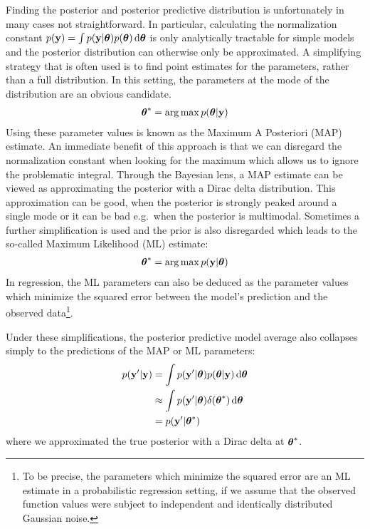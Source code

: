\documentclass[../thesis.tex]{subfiles}
\begin{document}
Finding the posterior and posterior predictive distribution is unfortunately in many cases not straightforward. In particular, calculating the normalization constant $p(\boldsymbol{\mathbf{y}})=\int p(\boldsymbol{\mathbf{y}} | \boldsymbol{\mathbf{\theta}}) p(\boldsymbol{\mathbf{\theta}}) \mathop{}\!\mathrm{d}\boldsymbol{\mathbf{\theta}}$ is only analytically tractable for simple models and the posterior distribution can otherwise only be approximated. A simplifying strategy that is often used is to find point estimates for the parameters, rather than a full distribution. In this setting, the parameters at the mode of the distribution are an obvious candidate.
\begin{equation}
    \begin{split}
        \boldsymbol{\mathbf{\theta}}^{*} = \operatorname*{arg\,max} p(\boldsymbol{\mathbf{\theta}} | \boldsymbol{\mathbf{y}})
    \end{split}
\end{equation}
Using these parameter values is known as the Maximum A Posteriori (MAP) estimate. An immediate benefit of this approach is that we can disregard the normalization constant when looking for the maximum which allows us to ignore the problematic integral. Through the Bayesian lens, a MAP estimate can be viewed as approximating the posterior with a Dirac delta distribution. This approximation can be good, when the posterior is strongly peaked around a single mode or it can be bad e.g.\ when the posterior is multimodal. Sometimes a further simplification is used and the prior is also disregarded which leads to the so-called Maximum Likelihood (ML) estimate:
\begin{equation}
    \begin{split}
        \boldsymbol{\mathbf{\theta}}^{*} = \operatorname*{arg\,max} p(\boldsymbol{\mathbf{y}} | \boldsymbol{\mathbf{\theta}})
    \end{split}
\end{equation}
In regression, the ML parameters can also be deduced as the parameter values which minimize the squared error between the model's prediction and the observed data\footnote{To be precise, the parameters which minimize the squared error are an ML estimate in a probabilistic regression setting, if we assume that the observed function values were subject to independent and identically distributed Gaussian noise.}. 

Under these simplifications, the posterior predictive model average also collapses simply to the predictions of the MAP or ML parameters:
\begin{equation}
    \begin{split}
        p(\boldsymbol{\mathbf{y}}' | \boldsymbol{\mathbf{y}}) &= \int p(\boldsymbol{\mathbf{y}}' | \boldsymbol{\mathbf{\theta}}) p(\boldsymbol{\mathbf{\theta}} | \boldsymbol{\mathbf{y}}) \mathop{}\!\mathrm{d}\boldsymbol{\mathbf{\theta}} \\
        &\approx \int p(\boldsymbol{\mathbf{y}}' | \boldsymbol{\mathbf{\theta}}) \delta(\boldsymbol{\mathbf{\theta}}^{*}) \mathop{}\!\mathrm{d}\boldsymbol{\mathbf{\theta}} \\
        &= p(\boldsymbol{\mathbf{y}}' | \boldsymbol{\mathbf{\theta}}^{*})
    \end{split}
\end{equation}
where we approximated the true posterior with a Dirac delta at $\boldsymbol{\mathbf{\theta}}^{*}$.
\end{document}
